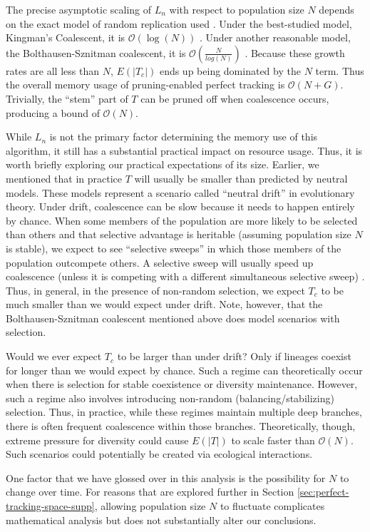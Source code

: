 The precise asymptotic scaling of $L_n$ with respect to population size $N$ depends on the exact model of random replication used \citep{tellier2014coalescence}.
Under the best-studied model, Kingman's Coalescent, it is $\mathcal{O}(\log(N))$ \citep{kingman1982coalescent, delmas2008asymptotic}.
Under another reasonable model, the Bolthausen-Sznitman coalescent, it is $\mathcal{O}(\frac{N}{log(N)})$ \citep{drmota2007asymptotic}.
Because these growth rates are all less than $N$, $E(|T_c|)$ ends up being dominated by the $N$ term.
Thus the overall memory usage of pruning-enabled perfect tracking is $\mathcal{O}(N + G)$.
Trivially, the ``stem'' part of $T$ can be pruned off when coalescence occurs, producing a bound of $\mathcal{O}(N)$.

While $L_n$ is not the primary factor determining the memory use of this algorithm, it still has a substantial practical impact on resource usage.
Thus, it is worth briefly exploring our practical expectations of its size.
Earlier, we mentioned that in practice $T$ will usually be smaller than predicted by neutral models.
These models represent a scenario called ``neutral drift'' in evolutionary theory.
Under drift, coalescence can be slow because it needs to happen entirely by chance.
When some members of the population are more likely to be selected than others and that selective advantage is heritable (assuming population size $N$ is stable), we expect to see ``selective sweeps'' in which those members of the population outcompete others.
A selective sweep will usually speed up coalescence (unless it is competing with a different simultaneous selective sweep) \citep{neher2013genetic}.
Thus, in general, in the presence of non-random selection, we expect $T_c$ to be much smaller than we would expect under drift.
Note, however, that the Bolthausen-Sznitman coalescent mentioned above does model scenarios with selection.

Would we ever expect $T_c$ to be larger than under drift?
Only if lineages coexist for longer than we would expect by chance.
Such a regime can theoretically occur when there is selection for stable coexistence or diversity maintenance.
However, such a regime also involves introducing non-random (balancing/stabilizing) selection.
Thus, in practice, while these regimes maintain multiple deep branches, there is often frequent coalescence within those branches.
Theoretically, though, extreme pressure for diversity could cause $E(|T|)$ to scale faster than $\mathcal{O}(N)$.
Such scenarios could potentially be created via ecological interactions.  %

One factor that we have glossed over in this analysis is the possibility for $N$ to change over time.
For reasons that are explored further in Section \ref{sec:perfect-tracking-space-supp}, allowing population size $N$ to fluctuate complicates mathematical analysis but does not substantially alter our conclusions.
